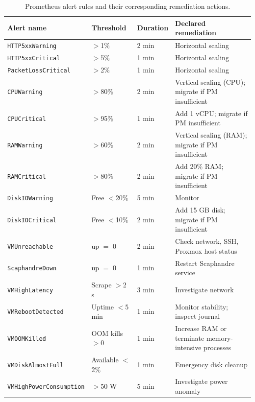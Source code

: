 \documentclass[12pt,a4paper]{report}
\begin{document}
\begin{table}[htbp]
\centering
\caption{Prometheus alert rules and their corresponding remediation actions.}
\label{tab:alert_rules}
\begin{tabular}{L{3.8cm} C{1.8cm} C{1.8cm} L{5.5cm}}
\toprule
\textbf{Alert name} & \textbf{Threshold} & \textbf{Duration} & \textbf{Declared remediation} \\
\midrule
\texttt{HTTP5xxWarning}          & $>$1\%    & 2 min & Horizontal scaling \\
\texttt{HTTP5xxCritical}         & $>$5\%    & 1 min & Horizontal scaling \\
\texttt{PacketLossCritical}      & $>$2\%    & 1 min & Horizontal scaling \\
\texttt{CPUWarning}              & $>$80\%   & 2 min & Vertical scaling (CPU); migrate if PM insufficient \\
\texttt{CPUCritical}             & $>$95\%   & 1 min & Add 1 vCPU; migrate if PM insufficient \\
\texttt{RAMWarning}              & $>$60\%   & 2 min & Vertical scaling (RAM); migrate if PM insufficient \\
\texttt{RAMCritical}             & $>$80\%   & 2 min & Add 20\% RAM; migrate if PM insufficient \\
\texttt{DiskIOWarning}           & Free $<$20\% & 5 min & Monitor \\
\texttt{DiskIOCritical}          & Free $<$10\% & 2 min & Add 15 GB disk; migrate if PM insufficient \\
\texttt{VMUnreachable}           & up $=$ 0  & 2 min & Check network, SSH, Proxmox host status \\
\texttt{ScaphandreDown}          & up $=$ 0  & 1 min & Restart Scaphandre service \\
\texttt{VMHighLatency}           & Scrape $>$2 s & 3 min & Investigate network \\
\texttt{VMRebootDetected}        & Uptime $<$5 min & 1 min & Monitor stability; inspect journal \\
\texttt{VMOOMKilled}             & OOM kills $>$0 & 1 min & Increase RAM or terminate memory-intensive processes \\
\texttt{VMDiskAlmostFull}        & Available $<$2\% & 1 min & Emergency disk cleanup \\
\texttt{VMHighPowerConsumption}  & $>$50 W   & 5 min & Investigate power anomaly \\
\bottomrule
\end{tabular}
\end{table}
\end{document}
